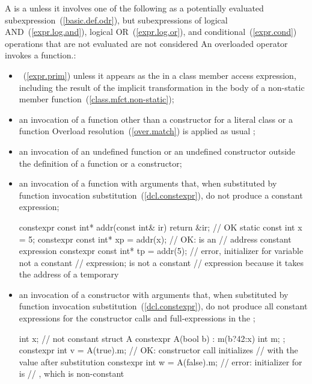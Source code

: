 \pnum
A  is a
unless it involves one of the following as a potentially evaluated
subexpression~(\ref{basic.def.odr}), but 
subexpressions of logical AND~(\ref{expr.log.and}),
logical OR~(\ref{expr.log.or}), and conditional~(\ref{expr.cond})
operations that are not evaluated are not considered 
\enternote An overloaded operator invokes a function.\exitnote:

\begin{itemize}
\item
{}~(\ref{expr.prim}) unless it appears as
the  in a class member access
expression, including the result of the implicit transformation in the body
of a non-static member function~(\ref{class.mfct.non-static});

\item
an invocation of a function other than
a  constructor for a literal class or
a  function
\enternote Overload resolution~(\ref{over.match})
is applied as usual \exitnote;

\item
an invocation of an undefined  function or an
undefined  constructor outside the definition of a 
function or a  constructor;

\item
an invocation of a  function with arguments that, when
substituted by function invocation substitution~(\ref{dcl.constexpr}),
do not
produce a constant expression; \enterexample
\begin{codeblock}
constexpr const int* addr(const int& ir) { return &ir; }  // OK
static const int x = 5;
constexpr const int* xp = addr(x);  // OK:  is an
                                    // address constant expression
constexpr const int* tp = addr(5);  // error, initializer for  variable not a constant
                                    // expression;  is not a constant
                                    // expression because it takes the address of a temporary
\end{codeblock}
\exitexample

\item
an invocation of a  constructor with arguments that, when substituted
by function invocation substitution~(\ref{dcl.constexpr}), do not produce all constant
expressions for the constructor calls and full-expressions in the
; \enterexample
\begin{codeblock}
int x;                              // not constant
struct A {
  constexpr A(bool b) : m(b?42:x) { }
  int m;
};
constexpr int v = A(true).m;        // OK: constructor call initializes
                                    //  with the value  after substitution
constexpr int w = A(false).m;       // error: initializer for  is
                                    // , which is non-constant
\end{codeblock}
\exitexample


\end{itemize}
